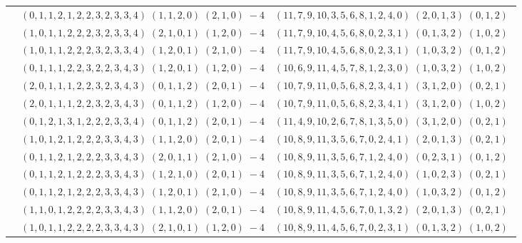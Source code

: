 \documentclass[11pt]{article}
\begin{document}
\begin{longtable}[l]{|c|c|c|}
 \cline{2-3} 
 & $(0 ,1 ,1 ,2 ,1 ,2 ,2 ,3 ,2 ,3 ,3 ,4) \;(1 ,1 ,2 ,0) \;(2 ,1 ,0) \;-4$ & $(11 ,7 ,9 ,10 ,3 ,5 ,6 ,8 ,1 ,2 ,4 ,0) \;(2 ,0 ,1 ,3) \;(0 ,1 ,2) \;$\\ 
 \cline{2-3} 
 & $(1 ,0 ,1 ,1 ,2 ,2 ,2 ,3 ,2 ,3 ,3 ,4) \;(2 ,1 ,0 ,1) \;(1 ,2 ,0) \;-4$ & $(11 ,7 ,9 ,10 ,4 ,5 ,6 ,8 ,0 ,2 ,3 ,1) \;(0 ,1 ,3 ,2) \;(1 ,0 ,2) \;$\\ 
 \cline{2-3} 
 & $(1 ,0 ,1 ,1 ,2 ,2 ,2 ,3 ,2 ,3 ,3 ,4) \;(1 ,2 ,0 ,1) \;(2 ,1 ,0) \;-4$ & $(11 ,7 ,9 ,10 ,4 ,5 ,6 ,8 ,0 ,2 ,3 ,1) \;(1 ,0 ,3 ,2) \;(0 ,1 ,2) \;$\\ 
 \cline{2-3} 
 & $(0 ,1 ,1 ,1 ,2 ,2 ,3 ,2 ,2 ,3 ,4 ,3) \;(1 ,2 ,0 ,1) \;(1 ,2 ,0) \;-4$ & $(10 ,6 ,9 ,11 ,4 ,5 ,7 ,8 ,1 ,2 ,3 ,0) \;(1 ,0 ,3 ,2) \;(1 ,0 ,2) \;$\\ 
 \cline{2-3} 
 & $(2 ,0 ,1 ,1 ,1 ,2 ,2 ,3 ,2 ,3 ,4 ,3) \;(0 ,1 ,1 ,2) \;(2 ,0 ,1) \;-4$ & $(10 ,7 ,9 ,11 ,0 ,5 ,6 ,8 ,2 ,3 ,4 ,1) \;(3 ,1 ,2 ,0) \;(0 ,2 ,1) \;$\\ 
 \cline{2-3} 
 & $(2 ,0 ,1 ,1 ,1 ,2 ,2 ,3 ,2 ,3 ,4 ,3) \;(0 ,1 ,1 ,2) \;(1 ,2 ,0) \;-4$ & $(10 ,7 ,9 ,11 ,0 ,5 ,6 ,8 ,2 ,3 ,4 ,1) \;(3 ,1 ,2 ,0) \;(1 ,0 ,2) \;$\\ 
 \cline{2-3} 
 & $(0 ,1 ,2 ,1 ,3 ,1 ,2 ,2 ,2 ,3 ,3 ,4) \;(0 ,1 ,1 ,2) \;(2 ,0 ,1) \;-4$ & $(11 ,4 ,9 ,10 ,2 ,6 ,7 ,8 ,1 ,3 ,5 ,0) \;(3 ,1 ,2 ,0) \;(0 ,2 ,1) \;$\\ 
 \cline{2-3} 
 & $(1 ,0 ,1 ,2 ,1 ,2 ,2 ,2 ,3 ,3 ,4 ,3) \;(1 ,1 ,2 ,0) \;(2 ,0 ,1) \;-4$ & $(10 ,8 ,9 ,11 ,3 ,5 ,6 ,7 ,0 ,2 ,4 ,1) \;(2 ,0 ,1 ,3) \;(0 ,2 ,1) \;$\\ 
 \cline{2-3} 
 & $(0 ,1 ,1 ,2 ,1 ,2 ,2 ,2 ,3 ,3 ,4 ,3) \;(2 ,0 ,1 ,1) \;(2 ,1 ,0) \;-4$ & $(10 ,8 ,9 ,11 ,3 ,5 ,6 ,7 ,1 ,2 ,4 ,0) \;(0 ,2 ,3 ,1) \;(0 ,1 ,2) \;$\\ 
 \cline{2-3} 
 & $(0 ,1 ,1 ,2 ,1 ,2 ,2 ,2 ,3 ,3 ,4 ,3) \;(1 ,2 ,1 ,0) \;(2 ,0 ,1) \;-4$ & $(10 ,8 ,9 ,11 ,3 ,5 ,6 ,7 ,1 ,2 ,4 ,0) \;(1 ,0 ,2 ,3) \;(0 ,2 ,1) \;$\\ 
 \cline{2-3} 
 & $(0 ,1 ,1 ,2 ,1 ,2 ,2 ,2 ,3 ,3 ,4 ,3) \;(1 ,2 ,0 ,1) \;(2 ,1 ,0) \;-4$ & $(10 ,8 ,9 ,11 ,3 ,5 ,6 ,7 ,1 ,2 ,4 ,0) \;(1 ,0 ,3 ,2) \;(0 ,1 ,2) \;$\\ 
 \cline{2-3} 
 & $(1 ,1 ,0 ,1 ,2 ,2 ,2 ,2 ,3 ,3 ,4 ,3) \;(1 ,1 ,2 ,0) \;(2 ,0 ,1) \;-4$ & $(10 ,8 ,9 ,11 ,4 ,5 ,6 ,7 ,0 ,1 ,3 ,2) \;(2 ,0 ,1 ,3) \;(0 ,2 ,1) \;$\\ 
 \cline{2-3} 
 & $(1 ,0 ,1 ,1 ,2 ,2 ,2 ,2 ,3 ,3 ,4 ,3) \;(2 ,1 ,0 ,1) \;(1 ,2 ,0) \;-4$ & $(10 ,8 ,9 ,11 ,4 ,5 ,6 ,7 ,0 ,2 ,3 ,1) \;(0 ,1 ,3 ,2) \;(1 ,0 ,2) \;$\\ 

\end{longtable}
\end{document}
